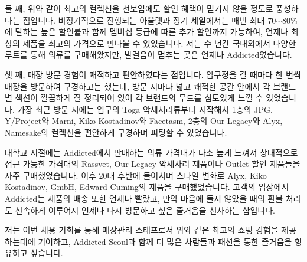 둘 째, 위와 같이 최고의 컬렉션을 선보임에도 할인 혜택이 믿기지 않을 정도로 풍성하다는 점입니다. 비정기적으로 진행되는 아울렛과 정기 세일에서는 매번 최대 70$\sim$80\% 에 달하는 높은 할인률과 함께 멤버십 등급에 따른 추가 할인까지 가능하여, 언제나 최상의 제품을 최고의 가격으로 만나볼 수 있었습니다. 저는 수 년간 국내외에서 다양한 루트를 통해 의류를 구매해왔지만, 발걸음이 멈추는 곳은 언제나 Addicted였습니다.

셋 째, 매장 방문 경험이 쾌적하고 편안하였다는 점입니다. 압구정을 갈 때마다 한 번씩 매장을 방문하여 구경하고는 했는데, 방문 시마다 넓고 쾌적한 공간 안에서 각 브랜드별 섹션이 깔끔하게 잘 정리되어 있어 각 브랜드의 무드를 심도있게 느낄 수 있었습니다. 가장 최근 방문 시에는 입구의 Toga 악세서리류부터 시작해서 1층의 JPG, Y/Project와 Marni, Kiko Kostadinov와 Facetasm, 2층의 Our Legacy와 Alyx, Namesake의 컬렉션을 편안하게 구경하며 피팅할 수 있었습니다.

대학교 시절에는 Addicted에서 판매하는 의류 가격대가 다소 높게 느껴져 상대적으로 접근 가능한 가격대의 Rassvet, Our Legacy 악세사리 제품이나 Outlet 할인 제품들을 자주 구매했었습니다. 이후 20대 후반에 들어서며 스타일 변화로 Alyx, Kiko Kostadinov, GmbH, Edward Cuming의 제품을 구매했었습니다. 고객의 입장에서 Addicted는 제품의 배송 또한 언제나 빨랐고, 만약 마음에 들지 않았을 때의 환불 처리도 신속하게 이루어져 언제나 다시 방문하고 싶은 즐거움을 선사하는 샵입니다.

저는 이번 채용 기회를 통해  매장관리 스태프로서 위와 같은 최고의 쇼핑 경험을 제공하는데에 기여하고, Addicted Seoul과 함께 더 많은 사람들과 패션을 통한 즐거움을 향유하고 싶습니다.




